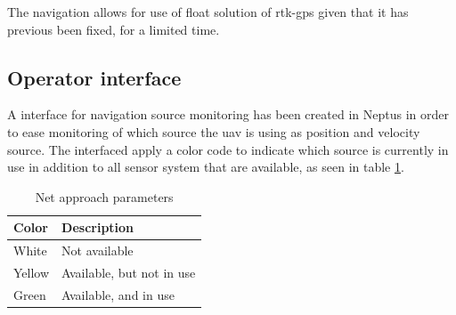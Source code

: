 The navigation allows for use of float solution of \gls{rtk-gps} given that it has previous been fixed, for a limited time. 

\subsection{Operator interface}
A interface for navigation source monitoring has been created in Neptus in order to ease monitoring of which source the \gls{uav} is using as position and velocity source. The interfaced apply a color code to indicate which source is currently in use in addition to all sensor system that are available, as seen in table \ref{Tb:Color Code}.

\begin{table}[H]
\begin{center}
    \begin{tabular}{ | l | l |}
    \hline
    \textbf{Color} & \textbf{Description} \\ \hline
    White & Not available \\ \hline
    Yellow & Available, but not in use \\ \hline
    Green & Available, and in use \\ \hline
    \end{tabular}
\end{center}
\caption{Net approach parameters }
\label{Tb:Color Code}
\end{table}


